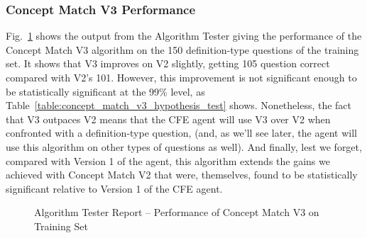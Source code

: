 \subsubsection{Concept Match V3 Performance}

Fig.~\ref{fig:concept_match_v3_training_set_performance} shows the output from the Algorithm Tester giving the performance of the Concept Match V3 algorithm on the 150 definition-type questions of the training set.  It shows that V3 improves on V2 slightly, getting 105 question correct compared with V2's 101.  However, this improvement is not significant enough to be statistically significant at the 99\% level, as Table~\ref{table:concept_match_v3_hypothesis_test} shows.  Nonetheless, the fact that V3 outpaces V2 means that the CFE agent will use V3 over V2 when confronted with a definition-type question, (and, as we'll see later, the agent will use this algorithm on other types of questions as well).  And finally, lest we forget, compared with Version 1 of the agent, this algorithm extends the gains we achieved with Concept Match V2 that were, themselves, found to be statistically significant relative to Version 1 of the CFE agent.

\begin{figure}
\centering
\vspace{0.75in}
\caption{Algorithm Tester Report -- Performance of Concept Match V3 on Training Set}
\label{fig:concept_match_v3_training_set_performance}
\end{figure}




